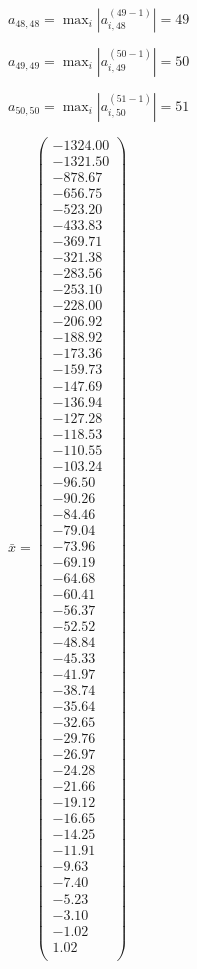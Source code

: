 \documentclass[a4paper,12pt]{article}
\begin{document}
$a _{ 48, 48 } =  \max _i |a _{ i, 48 } ^{ (49 - 1) } | = 49$

$a _{ 49, 49 } =  \max _i |a _{ i, 49 } ^{ (50 - 1) } | = 50$

$a _{ 50, 50 } =  \max _i |a _{ i, 50 } ^{ (51 - 1) } | = 51$

$\bar { x } = \begin{pmatrix}
-1324.00 \\
-1321.50 \\
-878.67 \\
-656.75 \\
-523.20 \\
-433.83 \\
-369.71 \\
-321.38 \\
-283.56 \\
-253.10 \\
-228.00 \\
-206.92 \\
-188.92 \\
-173.36 \\
-159.73 \\
-147.69 \\
-136.94 \\
-127.28 \\
-118.53 \\
-110.55 \\
-103.24 \\
-96.50 \\
-90.26 \\
-84.46 \\
-79.04 \\
-73.96 \\
-69.19 \\
-64.68 \\
-60.41 \\
-56.37 \\
-52.52 \\
-48.84 \\
-45.33 \\
-41.97 \\
-38.74 \\
-35.64 \\
-32.65 \\
-29.76 \\
-26.97 \\
-24.28 \\
-21.66 \\
-19.12 \\
-16.65 \\
-14.25 \\
-11.91 \\
-9.63 \\
-7.40 \\
-5.23 \\
-3.10 \\
-1.02 \\
1.02 \\
\end{pmatrix}
$
\end{document}
